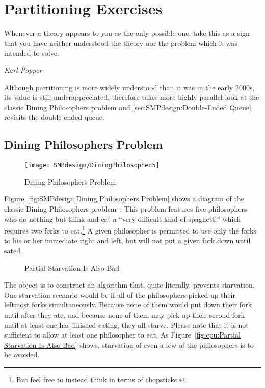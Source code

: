 
\section{Partitioning Exercises}
\label{sec:SMPdesign:Partitioning Exercises}
%
\epigraph{Whenever a theory appears to you as the only possible one,
	  take this as a sign that you have neither understood the theory
	  nor the problem which it was intended to solve.}
	  {\emph{Karl Popper}}

Although partitioning is more widely understood than it was in the early
2000s, its value is still underappreciated.
therefore takes more highly parallel look at the classic Dining
Philosophers problem and
\cref{sec:SMPdesign:Double-Ended Queue}
revisits the double-ended queue.

\subsection{Dining Philosophers Problem}
\label{sec:SMPdesign:Dining Philosophers Problem}

\begin{figure}[tb]
\centering
\texttt{[image: SMPdesign/DiningPhilosopher5]}
\caption{Dining Philosophers Problem}
\end{figure}

Figure~\ref{fig:SMPdesign:Dining Philosophers Problem} shows a diagram
of the classic Dining Philosophers problem~\cite{Dijkstra1971HOoSP}.
This problem features five philosophers who do nothing but think and
eat a ``very difficult kind of spaghetti'' which requires two forks
to eat.\footnote{
	But feel free to instead think in terms of chopsticks.}
A given philosopher is permitted to use only the forks to his or her
immediate right and left, but will not put a given fork down until sated.

\begin{figure*}[tb]
\centering
{}
\caption{Partial Starvation Is Also Bad}
\end{figure*}

The object is to construct an algorithm that, quite literally,
prevents starvation.
One starvation scenario would be if all of the philosophers picked up
their leftmost forks simultaneously.
Because none of them would put down their fork until after they ate,
and because none of them may pick up their second fork until at least
one has finished eating, they all starve.
Please note that it is not sufficient to allow at least one philosopher
to eat.
As Figure~\ref{fig:cpu:Partial Starvation Is Also Bad}
shows, starvation of even a few of the philosophers is to be avoided.

